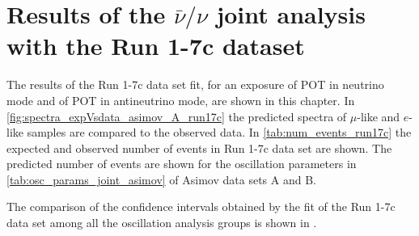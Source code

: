 
\clearpage

\section {Results of the $\bar{\nu}/\nu$ joint analysis with the Run 1-7c dataset}
\label{sec:results}

The results of the Run 1-7c data set fit,
for an exposure 
of \TotalPotNuRunOneSevenC POT in neutrino mode
and
of \TotalPotNuBarRunOneSevenC POT in antineutrino mode, 
are shown in this chapter.
In \cref{fig:spectra_expVsdata_asimov_A_run17c} the predicted spectra of $\mu$-like and $e$-like samples
are compared to the observed data.
In \cref{tab:num_events_run17c} the expected and observed number of events in Run 1-7c data set are shown.
The predicted number of events are shown for the oscillation parameters in \cref{tab:osc_params_joint_asimov}
of Asimov data sets A and B.

The comparison of the confidence intervals obtained by the fit of the Run 1-7c data set
among all the oscillation analysis groups is shown in \cite{Mach3JointFitCCPi}.

